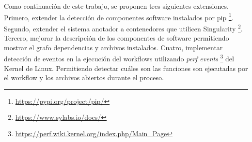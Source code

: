 Como continuación de este trabajo, se proponen tres siguientes extensiones.
Primero, extender la detección de componentes software instalados por pip \footnote{\url{https://pypi.org/project/pip/}}. 
Segundo, extender el sistema anotador a contenedores que utilicen Singularity \footnote{\url{https://www.sylabs.io/docs/}}.
Tercero, mejorar la descripción de los componentes de software permitiendo mostrar el grafo dependencias y archivos instalados.
Cuatro, implementar detección de eventos en la ejecución del workflows utilizando \emph{perf events} \footnote{\url{https://perf.wiki.kernel.org/index.php/Main_Page}} del Kernel de Linux.
Permitiendo detectar cuáles son las funciones son ejecutadas por el workflow y los archivos abiertos durante el proceso.